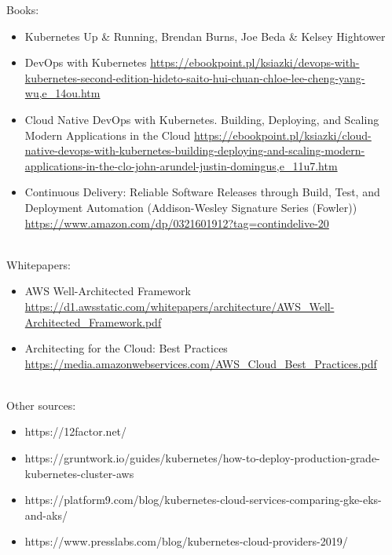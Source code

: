 \documentclass[12pt]{article}
\begin{document}
Books:
\begin{itemize}
    \item Kubernetes Up \& Running, Brendan Burns, Joe Beda & Kelsey Hightower
    \item DevOps with Kubernetes \url{https://ebookpoint.pl/ksiazki/devops-with-kubernetes-second-edition-hideto-saito-hui-chuan-chloe-lee-cheng-yang-wu,e_14ou.htm}
    \item Cloud Native DevOps with Kubernetes. Building, Deploying, and Scaling Modern Applications in the Cloud \url{https://ebookpoint.pl/ksiazki/cloud-native-devops-with-kubernetes-building-deploying-and-scaling-modern-applications-in-the-clo-john-arundel-justin-domingus,e_11u7.htm}
    \item Continuous Delivery: Reliable Software Releases through Build, Test, and Deployment Automation (Addison-Wesley Signature Series (Fowler)) \url{https://www.amazon.com/dp/0321601912?tag=contindelive-20}
\end{itemize}
~\\
Whitepapers:
\begin{itemize}
    \item AWS Well-Architected Framework \url{https://d1.awsstatic.com/whitepapers/architecture/AWS_Well-Architected_Framework.pdf}
    \item Architecting for the Cloud: Best Practices  \url{https://media.amazonwebservices.com/AWS_Cloud_Best_Practices.pdf}
\end{itemize}
~\\
Other sources:
\begin{itemize}
    \item https://12factor.net/
    \item https://gruntwork.io/guides/kubernetes/how-to-deploy-production-grade-kubernetes-cluster-aws
    \item https://platform9.com/blog/kubernetes-cloud-services-comparing-gke-eks-and-aks/
    \item https://www.presslabs.com/blog/kubernetes-cloud-providers-2019/
\end{itemize}
\end{document}
